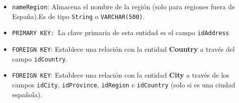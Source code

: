 \begin{itemize}
\begin{itemize}
        \item \texttt{nameRegion}: Almacena el nombre de la región (solo para regiones fuera de España).Es de tipo \texttt{String} o \texttt{VARCHAR(500)}.
        \item \texttt{PRIMARY KEY: }La clave primaria de esta entidad es el campo \texttt{idAddress}
        \item \texttt{FOREIGN KEY}: Establece una relación con la entidad \textbf{Country} a través del campo \texttt{idCountry}.
        \item \texttt{FOREIGN KEY}: Establece una relación con la entidad \textbf{City} a través de los campos \texttt{idCity}, \texttt{idProvince}, \texttt{idRegion} e \texttt{idCountry} (solo si es una ciudad española).
        \end{itemize}


\end{itemize}
